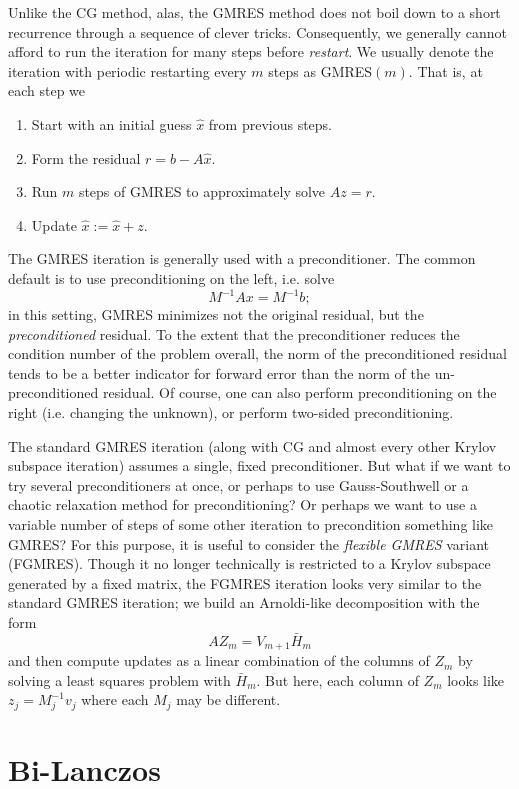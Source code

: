 \documentclass[12pt, leqno]{article} %
\begin{document}
Unlike the CG method, alas, the GMRES method does not boil down to a
short recurrence through a sequence of clever tricks.  Consequently,
we generally cannot afford to run the iteration for many steps before
{\em restart}.  We usually denote the iteration with periodic
restarting every $m$ steps as GMRES$(m)$.  That is, at each step we
\begin{enumerate}
  \item Start with an initial guess $\hat{x}$ from previous steps.
  \item Form the residual $r = b-A\hat{x}$.
  \item Run $m$ steps of GMRES to approximately solve $Az = r$.
  \item Update $\hat{x} := \hat{x} + z$.
\end{enumerate}

The GMRES iteration is generally used with a preconditioner.
The common default is to use preconditioning on the left, i.e.
solve
\[
  M^{-1} A x = M^{-1} b;
\]
in this setting, GMRES minimizes not the original residual,
but the {\em preconditioned} residual.  To the extent that the
preconditioner reduces the condition number of the problem overall,
the norm of the preconditioned residual tends to be a better indicator
for forward error than the norm of the un-preconditioned residual.
Of course, one can also perform preconditioning on the right (i.e. changing
the unknown), or perform two-sided preconditioning.

The standard GMRES iteration (along with CG and almost every other
Krylov subspace iteration) assumes a single, fixed preconditioner.
But what if we want to try several preconditioners at once, or
perhaps to use Gauss-Southwell or a chaotic relaxation method for
preconditioning?  Or perhaps we want to use a variable number of
steps of some other iteration to precondition something like GMRES?
For this purpose, it is useful to consider the
{\em flexible GMRES} variant (FGMRES).  Though it no longer technically
is restricted to a Krylov subspace generated by a fixed matrix, the
FGMRES iteration looks very similar to the standard GMRES iteration;
we build an Arnoldi-like decomposition with the form
\[
  AZ_m = V_{m+1} \bar{H}_m
\]
and then compute updates as a linear combination of the columns of $Z_m$
by solving a least squares problem with $\bar{H}_m$.  But here, each
column of $Z_m$ looks like $z_j = M_j^{-1} v_j$ where each $M_j$ may
be different.

\section{Bi-Lanczos}
\end{document}
